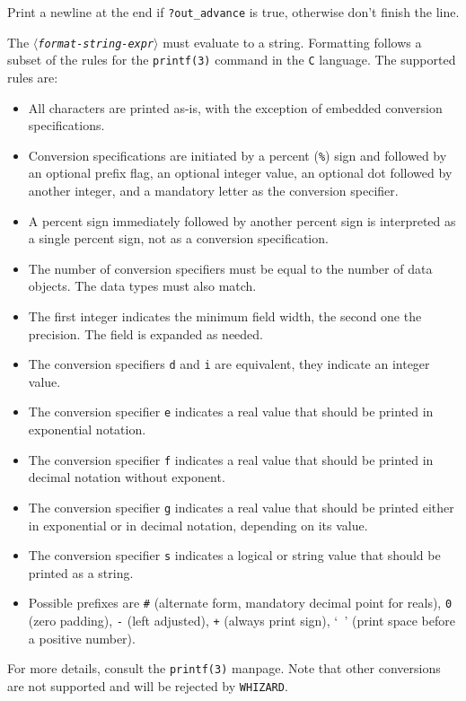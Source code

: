 \documentclass[12pt]{book}
\newcommand{\var}[1]{$\langle$\textit{#1}$\rangle$}
\newcommand{\ttt}[1]{\texttt{#1}}
\newcommand{\whizard}{\texttt{WHIZARD}}
\begin{document}
Print a newline at the end if \ttt{?out\_advance} is true, otherwise don't
finish the line.

The \ttt{\var{format-string-expr}} must evaluate to a string.  Formatting
follows a subset of the rules for the \ttt{printf(3)} command in the \ttt{C}
language.  The supported rules are:
\begin{itemize}
\item All characters are printed as-is, with the exception of embedded
  conversion specifications.
\item Conversion specifications are initiated by a percent (\verb|%|) sign and
  followed by an optional prefix flag, an optional integer value, an optional
  dot followed by another integer, and a mandatory letter as the conversion
  specifier.
\item A percent sign immediately followed by another percent sign is
  interpreted as a single percent sign, not as a conversion specification.
\item The number of conversion specifiers must be equal to the number of data
  objects.  The data types must also match.
\item The first integer indicates the minimum field width, the second one the
  precision.  The field is expanded as needed.
\item The conversion specifiers \ttt{d} and \ttt{i} are equivalent, they
  indicate an integer value.
\item The conversion specifier \ttt{e} indicates a real value that should be
  printed in exponential notation.
\item The conversion specifier \ttt{f} indicates a real value that should be
  printed in decimal notation without exponent.
\item The conversion specifier \ttt{g} indicates a real value that should be
  printed either in exponential or in decimal notation, depending on its
  value.
\item The conversion specifier \ttt{s} indicates a logical or string value
  that should be printed as a string.
\item Possible prefixes are \verb|#| (alternate form, mandatory decimal point
  for reals), \verb|0| (zero padding), \verb|-| (left adjusted), \verb|+|
  (always print sign), `\verb| |' (print space before a positive number).
\end{itemize}
For more details, consult the \verb|printf(3)| manpage.  Note that other
conversions are not supported and will be rejected by \whizard.
\end{document}
